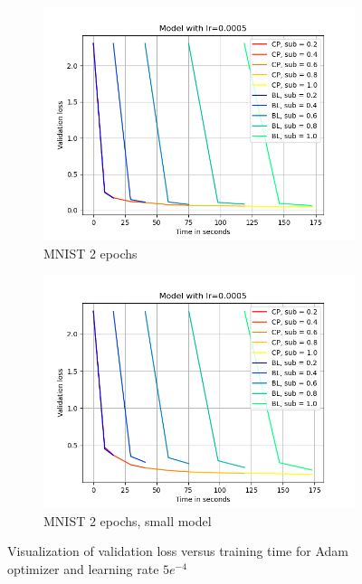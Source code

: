 \begin{figure}[h]
\begin{subfigure}[b]{0.24\textwidth}
        \centering
        \includegraphics[width=\textwidth]{figures/22_07/2ep/loss_time_0.0005.png}
        \caption{MNIST 2 epochs}
        \label{fig:2c}
    \end{subfigure}
    \begin{subfigure}[b]{0.24\textwidth}
        \centering
        \includegraphics[width=\textwidth]{figures/22_07/2ep_smaller/loss_time_0.0005.png}
        \caption{MNIST 2 epochs, small model}
        \label{fig:2d}
    \end{subfigure}
    \caption{Visualization of validation loss versus training time for Adam optimizer and learning rate $5e^{-4}$}
    \label{fig:three graphs}
\end{figure}


